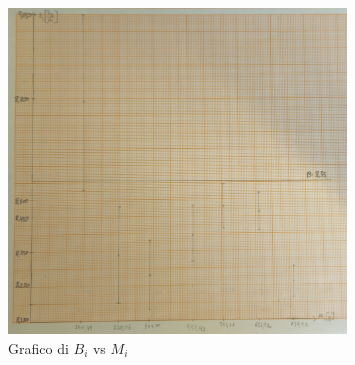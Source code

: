 \documentclass[a4paper]{article}
\begin{document}
\begin{figure}[!h]
    \centering
    \includegraphics[width=0.8\textwidth]{fotoyoung/young_bi.jpg}
    \caption{Grafico di $B_i$ vs $M_i$}
\end{figure}
\end{document}
